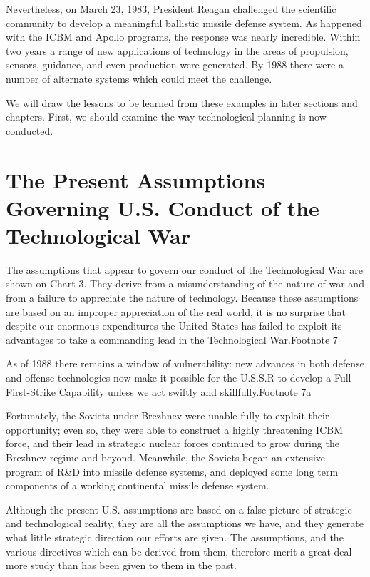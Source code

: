 Nevertheless, on March 23, 1983, President Reagan challenged the scientific community to develop a meaningful ballistic missile defense system. As happened with the ICBM and Apollo programs, the response was nearly incredible. Within two years a range of new applications of technology in the areas of propulsion, sensors, guidance, and even production were generated. By 1988 there were a number of alternate systems which could meet the challenge.

We will draw the lessons to be learned from these examples in later sections and chapters. First, we should examine the way technological planning is now conducted.

\section{The Present Assumptions Governing U.S. Conduct of the Technological War}
The assumptions that appear to govern our conduct of the Technological War are shown on Chart 3. They derive from a misunderstanding of the nature of war and from a failure to appreciate the nature of technology. Because these assumptions are based on an improper appreciation of the real world, it is no surprise that despite our enormous expenditures the United States has failed to exploit its advantages to take a commanding lead in the Technological War.Footnote 7

As of 1988 there remains a window of vulnerability: new advances in both defense and offense technologies now make it possible for the U.S.S.R to develop a Full First-Strike Capability unless we act swiftly and skillfully.Footnote 7a

Fortunately, the Soviets under Brezhnev were unable fully to exploit their opportunity; even so, they were able to construct a highly threatening ICBM force, and their lead in strategic nuclear forces continued to grow during the Brezhnev regime and beyond. Meanwhile, the Soviets began an extensive program of R\&D into missile defense systems, and deployed some long term components of a working continental missile defense system.

Although the present U.S. assumptions are based on a false picture of strategic and technological reality, they are all the assumptions we have, and they generate what little strategic direction our efforts are given. The assumptions, and the various directives which can be derived from them, therefore merit a great deal more study than has been given to them in the past.

